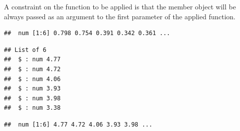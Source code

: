 \documentclass[krantz2]{krantz}\usepackage{knitr}
\begin{document}
\begin{warningbox}
A constraint on the function to be applied is that the member object will be always passed as an argument to the first parameter of the applied function.
\end{warningbox}

\begin{knitrout}\footnotesize
{}\color{fgcolor}\begin{kframe}
\begin{alltt}
\hlstd{(}\hlstd{)} 
 \hlkwb{<-} \hlstd{(}\hlstd{)} 
\end{alltt}
\begin{verbatim}
##  num [1:6] 0.798 0.754 0.391 0.342 0.361 ...
\end{verbatim}
\end{kframe}
\end{knitrout}

\begin{knitrout}\footnotesize
{}\color{fgcolor}\begin{kframe}
\begin{alltt}
 \hlkwb{<-} \hlstd{(}\hlstd{,} \hlstd{) \{} \hlopt{+} 
\end{alltt}
\end{kframe}
\end{knitrout}

\begin{knitrout}\footnotesize
{}\color{fgcolor}\begin{kframe}
\begin{alltt}
 \hlkwb{<-} \hlstd{(}     \hlstd{=} \hlstd{)}
\end{alltt}
\begin{verbatim}
## List of 6
##  $ : num 4.77
##  $ : num 4.72
##  $ : num 4.06
##  $ : num 3.93
##  $ : num 3.98
##  $ : num 3.38
\end{verbatim}
\end{kframe}
\end{knitrout}

\begin{knitrout}\footnotesize
{}\color{fgcolor}\begin{kframe}
\begin{alltt}
 \hlkwb{<-} \hlstd{(}     \hlstd{=} \hlstd{)}
\end{alltt}
\begin{verbatim}
##  num [1:6] 4.77 4.72 4.06 3.93 3.98 ...
\end{verbatim}
\end{kframe}
\end{knitrout}
\end{document}
